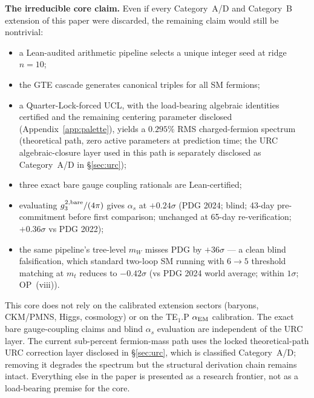 \documentclass[11pt]{article}
\theoremstyle{remark}
\begin{document}
\begin{tcolorbox}[colback=gray!5,colframe=gray!55!black,
  title={\textbf{Two Common Objections, Addressed Up Front}},
  fonttitle=\bfseries,left=5pt,right=5pt,top=4pt,bottom=4pt,breakable]
\smallskip
\noindent\textbf{The irreducible core claim.}  Even if every Category~A/D and Category~B extension of this paper were discarded, the remaining claim would still be nontrivial:
\begin{itemize}[leftmargin=1.3em,itemsep=0.05em,topsep=0.2em]
\item a Lean-audited arithmetic pipeline selects a unique integer seed at ridge $n=10$;
\item the GTE cascade generates canonical triples for all SM fermions;
\item a Quarter-Lock-forced UCL, with the load-bearing algebraic identities certified and the remaining centering parameter disclosed (Appendix~\ref{app:palette}), yields a $0.295\%$ RMS charged-fermion spectrum (theoretical path, zero active parameters at prediction time; the URC algebraic-closure layer used in this path is separately disclosed as Category~A/D in \S\ref{sec:urc});
\item three exact bare gauge coupling rationals are Lean-certified;
\item evaluating $g_3^{2,\rm bare}/(4\pi)$ gives $\alpha_s$ at $+0.24\sigma$ (PDG 2024; blind; 43-day pre-commitment before first comparison; unchanged at 65-day re-verification; $+0.36\sigma$ vs PDG 2022);
\item the same pipeline's tree-level $m_W$ misses PDG by $+36\sigma$ --- a clean blind falsification, which standard two-loop SM running with $6{\to}5$ threshold matching at $m_t$ reduces to $-0.42\sigma$ (vs PDG 2024 world average; within $1\sigma$; OP~(viii)).
\end{itemize}
This core does not rely on the calibrated extension sectors (baryons, CKM/PMNS, Higgs, cosmology) or on the TE$_1$.P $\alpha_{\rm EM}$ calibration.  The exact bare gauge-coupling claims and blind $\alpha_s$ evaluation are independent of the URC layer.  The current sub-percent fermion-mass path uses the locked theoretical-path URC correction layer disclosed in \S\ref{sec:urc}, which is classified Category~A/D; removing it degrades the spectrum but the structural derivation chain remains intact.  Everything else in the paper is presented as a research frontier, not as a load-bearing premise for the core.
\end{tcolorbox}
\end{document}
